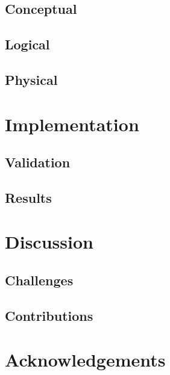 \documentclass{sigkddExp}
\begin{document}
\subsection{Conceptual}
\blindtext

\subsection{Logical}
\blindtext

\subsection{Physical}
\blindtext

\section{Implementation}
\blindtext

\subsection{Validation}
\blindtext

\subsection{Results}
\blindtext

\section{Discussion}
\blindtext

\subsection{Challenges}
\blindtext

\subsection{Contributions}
\blindtext

\section{Acknowledgements}
\blindtext

\printbibliography

\end{document}
